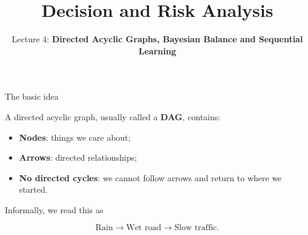 \documentclass[aspectratio=43,11pt]{beamer}
\title{Decision and Risk Analysis}
\subtitle{Lecture 4: \textbf{Directed Acyclic Graphs, Bayesian Balance and Sequential Learning}}
\author{\emph{}}
\date{\color{aggiemaroon}{
DAEN 427 / ISEN 427 / ISEN 627\\
\textbf{Alexander Abuabara}\\
Fall 2026
}}
\begin{document}

\begin{frame}
  \titlepage
\end{frame}

\begin{frame}{The basic idea}

A \alert{directed acyclic graph}, usually called a \textbf{DAG},
contains:

\begin{itemize}
  \item \textbf{Nodes}: things we care about;
  \item \textbf{Arrows}: directed relationships;
  \item \textbf{No directed cycles}: we cannot follow arrows and return
        to where we started.
\end{itemize}

\medskip

\begin{center}
\end{center}

\medskip

Informally, we read this as

\[
\text{Rain}
\longrightarrow
\text{Wet road}
\longrightarrow
\text{Slow traffic}.
\]

\end{frame}
\end{document}
